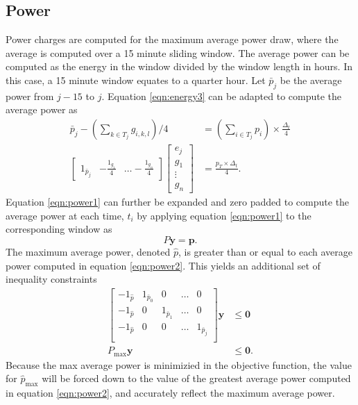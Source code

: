 \subsection{Power}
Power charges are computed for the maximum average power draw, where the average is computed over a 15 minute sliding window. The average power can be computed as the energy in the window divided by the window length in hours. In this case, a 15 minute window equates to a quarter hour. Let $\bar{p}_j$ be the average power from $j - 15$ to $j$. Equation \ref{eqn:energy3} can be adapted to compute the average power as
\begin{equation}\label{eqn:power1} 
	\begin{aligned}
		\bar{p}_j - \left ( \sum_{k\in T_j}g_{i,k,l} \right )/4 &= \left ( \sum_{i\in T_j}p_i \right ) \times \frac{\Delta_t}{4} \\
		\begin{bmatrix} 1_{\bar{p}_j} & -\frac{1_{g_1}}{4} & \hdots -\frac{1_{g_n}}{4} \end{bmatrix} \begin{bmatrix}e_j \\ g_1 \\ \vdots \\ g_n \end{bmatrix} &= \frac{p_T \times \Delta_t}{4}.
	\end{aligned}
\end{equation}
Equation \ref{eqn:power1} can further be expanded and zero padded to compute the average power at each time, $t_i$ by applying equation \ref{eqn:power1} to the corresponding window as
\begin{equation}\label{eqn:power2}
	P\mathbf{y} = \mathbf{p}.	
\end{equation}
The maximum average power, denoted $\hat{p}$, is greater than or equal to each average power computed in equation \ref{eqn:power2}.  This yields an additional set of inequality constraints 
\begin{equation}\label{eqn:cPower1}
	\begin{aligned}
		 \begin{bmatrix} 
			-1_{\hat{p}} & 1_{\bar{p}_0} & 0             & \hdots & 0 \\ 
	        	-1_{\hat{p}} & 0       & 1_{\bar{p}_1} & \hdots & 0\\
			-1_{\hat{p}} & 0       & 0 & \hdots    & 1_{\bar{p}_j} \\
		 \end{bmatrix}\mathbf{y} &\le \mathbf{0} \\ 
		 P_{\text{max}}\mathbf{y} &\le \mathbf{0}.
	\end{aligned}
\end{equation}
Because the max average power is minimizied in the objective function, the value for $\hat{p}_{\text{max}}$ will be forced down to the value of the greatest average power computed in equation \ref{eqn:power2}, and accurately reflect the maximum average power.
